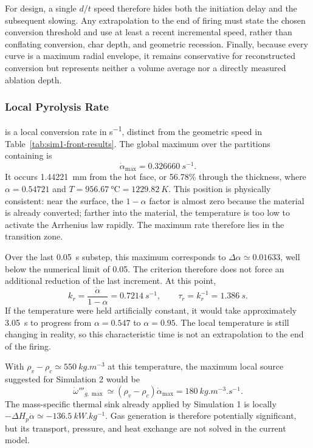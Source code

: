 \documentclass[oneside,openany]{amsdtx}
\begin{document}
For design, a single \(d/t\) speed therefore hides both the initiation delay
and the subsequent slowing. Any extrapolation to the end of firing must state
the chosen conversion threshold and use at least a recent incremental speed,
rather than conflating conversion, char depth, and geometric recession.
Finally, because every curve is a maximum radial envelope, it remains
conservative for reconstructed conversion but represents neither a volume
average nor a directly measured ablation depth.

\subsubsection{Local Pyrolysis Rate }

 is a local conversion rate in \si{s^{-1}}, distinct from the
geometric speed in Table~\ref{tab:sim1-front-results}. The global maximum over
the partitions containing  is
\[
  \boxed{\dot\alpha_\mathrm{max}=\SI{0.326660}{s^{-1}}.}
\]
It occurs \SI{1.44221}{mm} from the hot face, or 56.78\% through the
thickness, where \(\alpha=0.54721\) and
\(T=\SI{956.67}{\degreeCelsius}=\SI{1229.82}{K}\). This position is physically
consistent: near the surface, the \(1-\alpha\) factor is almost zero because
the material is already converted; farther into the material, the temperature
is too low to activate the Arrhenius law rapidly. The maximum rate therefore
lies in the transition zone.

Over the last \SI{0.05}{s} substep, this maximum corresponds to
\(\Delta\alpha\simeq0.01633\), well below the numerical limit of 0.05. The
 criterion therefore does not force an additional reduction of
the last increment. At this point,
\[
  k_r=\frac{\dot\alpha}{1-\alpha}=\SI{0.7214}{s^{-1}},
  \qquad \tau_r=k_r^{-1}=\SI{1.386}{s}.
\]
If the temperature were held artificially constant, it would take
approximately \SI{3.05}{s} to progress from \(\alpha=0.547\) to
\(\alpha=0.95\). The local temperature is still changing in reality, so this
characteristic time is not an extrapolation to the end of the firing.

With \(\rho_v-\rho_c\simeq\SI{550}{kg.m^{-3}}\) at this temperature, the
maximum local source suggested for Simulation 2 would be
\[
  \dot\omega'''_{g,\max}\simeq
  (\rho_v-\rho_c)\dot\alpha_\mathrm{max}
  =\SI{180}{kg.m^{-3}.s^{-1}}.
\]
The mass-specific thermal sink already applied by Simulation 1 is locally
\(-\Delta H_p\dot\alpha\simeq-\SI{136.5}{kW.kg^{-1}}\). Gas generation is
therefore potentially significant, but its transport, pressure, and heat
exchange are not solved in the current model.
\end{document}
